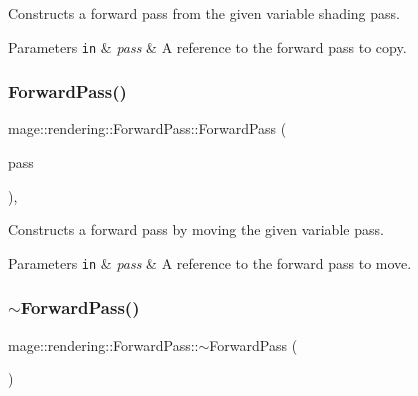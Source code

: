 Constructs a forward pass from the given variable shading pass.


\begin{DoxyParams}[1]{Parameters}
\mbox{\tt in}  & {\em pass} & A reference to the forward pass to copy. \\
\hline
\end{DoxyParams}
\mbox{\label{classmage_1_1rendering_1_1_forward_pass_a5f7026d7b4a439bdbacfeaf8fff152c1}} 
\subsubsection{\texorpdfstring{Forward\+Pass()}{ForwardPass()}\hspace{0.1cm}{\footnotesize\ttfamily [3/3]}}
{\footnotesize\ttfamily mage\+::rendering\+::\+Forward\+Pass\+::\+Forward\+Pass (\begin{DoxyParamCaption}\item[{\mbox{\hyperlink{classmage_1_1rendering_1_1_forward_pass}{Forward\+Pass}} \&\&}]{pass }\end{DoxyParamCaption})\hspace{0.3cm}{\ttfamily [default]}, {\ttfamily [noexcept]}}

Constructs a forward pass by moving the given variable pass.


\begin{DoxyParams}[1]{Parameters}
\mbox{\tt in}  & {\em pass} & A reference to the forward pass to move. \\
\hline
\end{DoxyParams}
\mbox{\label{classmage_1_1rendering_1_1_forward_pass_a9fdcc7dca5097f0feff2f7be92a2727c}} 
\subsubsection{\texorpdfstring{$\sim$\+Forward\+Pass()}{~ForwardPass()}}
{\footnotesize\ttfamily mage\+::rendering\+::\+Forward\+Pass\+::$\sim$\+Forward\+Pass (\begin{DoxyParamCaption}{ }\end{DoxyParamCaption})\hspace{0.3cm}{\ttfamily [default]}}

